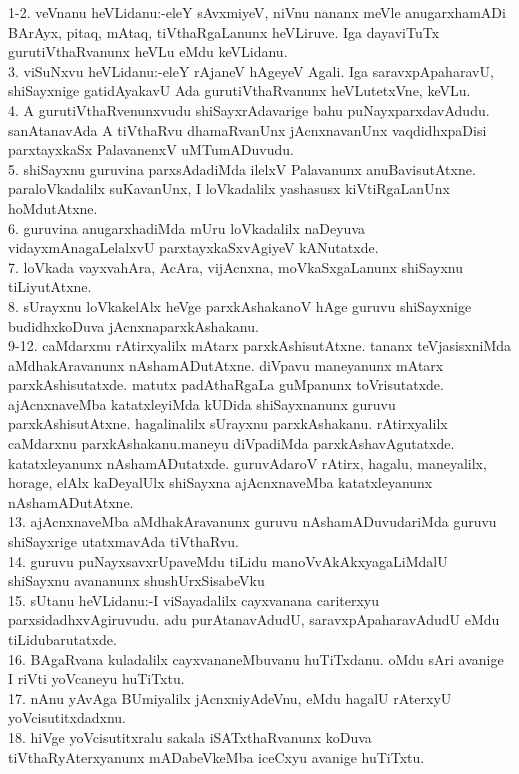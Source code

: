 \documentclass{article}
\begin{document}
1-2. veVnanu heVLidanu:-eleY sAvxmiyeV, niVnu nananx meVle anugarxhamADi BArAyx, pitaq, mAtaq, tiVthaRgaLanunx heVLiruve. Iga dayaviTuTx gurutiVthaRvanunx heVLu eMdu keVLidanu.\\
3. viSuNxvu heVLidanu:-eleY rAjaneV hAgeyeV Agali. Iga saravxpApaharavU, shiSayxnige gatidAyakavU Ada gurutiVthaRvanunx heVLutetxVne, keVLu.\\
4. A gurutiVthaRvenunxvudu shiSayxrAdavarige bahu puNayxparxdavAdudu. sanAtanavAda A tiVthaRvu dhamaRvanUnx jAcnxnavanUnx vaqdidhxpaDisi parxtayxkaSx PalavanenxV uMTumADuvudu.\\
5. shiSayxnu guruvina parxsAdadiMda ilelxV Palavanunx anuBavisutAtxne. paraloVkadalilx suKavanUnx, I loVkadalilx yashasusx kiVtiRgaLanUnx hoMdutAtxne.\\
6. guruvina anugarxhadiMda mUru loVkadalilx naDeyuva vidayxmAnagaLelalxvU parxtayxkaSxvAgiyeV kANutatxde.\\
7. loVkada vayxvahAra, AcAra, vijAcnxna, moVkaSxgaLanunx shiSayxnu tiLiyutAtxne.\\
8. sUrayxnu loVkakelAlx heVge parxkAshakanoV hAge guruvu shiSayxnige budidhxkoDuva jAcnxnaparxkAshakanu.\\
9-12. caMdarxnu rAtirxyalilx mAtarx parxkAshisutAtxne. tananx teVjasisxniMda aMdhakAravanunx nAshamADutAtxne. diVpavu maneyanunx mAtarx parxkAshisutatxde. matutx padAthaRgaLa guMpanunx toVrisutatxde. ajAcnxnaveMba katatxleyiMda kUDida shiSayxnanunx guruvu parxkAshisutAtxne. hagalinalilx sUrayxnu parxkAshakanu. rAtirxyalilx caMdarxnu parxkAshakanu.maneyu diVpadiMda parxkAshavAgutatxde. katatxleyanunx nAshamADutatxde. guruvAdaroV rAtirx, hagalu, maneyalilx, horage, elAlx kaDeyalUlx shiSayxna ajAcnxnaveMba katatxleyanunx nAshamADutAtxne.\\
13. ajAcnxnaveMba aMdhakAravanunx guruvu nAshamADuvudariMda guruvu shiSayxrige utatxmavAda tiVthaRvu.\\
14. guruvu puNayxsavxrUpaveMdu tiLidu manoVvAkAkxyagaLiMdalU shiSayxnu avananunx shushUrxSisabeVku\\
15. sUtanu heVLidanu:-I viSayadalilx cayxvanana cariterxyu parxsidadhxvAgiruvudu. adu purAtanavAdudU, saravxpApaharavAdudU eMdu tiLidubarutatxde.\\
16. BAgaRvana kuladalilx cayxvananeMbuvanu huTiTxdanu. oMdu sAri avanige I riVti yoVcaneyu huTiTxtu.\\
17. nAnu yAvAga BUmiyalilx jAcnxniyAdeVnu, eMdu hagalU rAterxyU yoVcisutitxdadxnu.\\
18. hiVge yoVcisutitxralu sakala iSATxthaRvanunx koDuva tiVthaRyAterxyanunx mADabeVkeMba iceCxyu avanige huTiTxtu.\\
\end{document}
